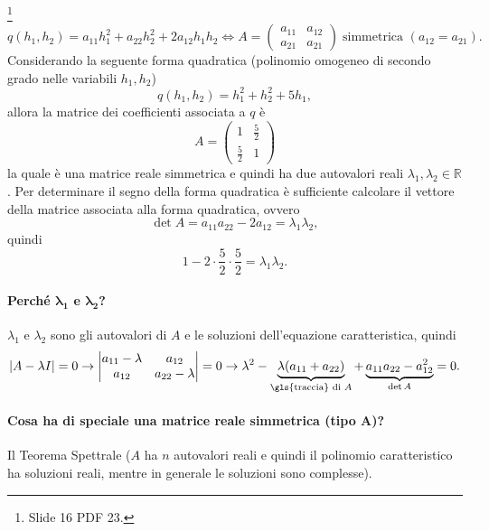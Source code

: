 \begin{example}[Forma quadratica, caso $n=2$]\footnote{Slide 16 PDF 23.}
	\begin{equation*}
		q(h_1, h_2) = a_{11} h_1^2 + a_{22} h_2^2 + 2 a_{12} h_1 h_2 \iff
		A =
		\begin{pmatrix}
			a_{11} & a_{12}\\
			a_{21} & a_{21}
		\end{pmatrix}\; \text{simmetrica } (a_{12}=a_{21}).
	\end{equation*}
	Considerando la seguente forma quadratica (polinomio omogeneo di secondo grado nelle variabili $h_1,h_2$)
	\begin{equation*}
		q(h_1,h_2) = h_1^2 + h_2^2 + 5 h_1,
	\end{equation*}
	allora la matrice dei coefficienti associata a $q$ è
	\begin{equation*}
		A =
		\begin{pmatrix}
			1 & \frac{5}{2}\\
			\frac{5}{2} & 1
		\end{pmatrix}
	\end{equation*}
	la quale è una matrice reale simmetrica e quindi ha due autovalori reali $\lambda_1,\lambda_2\in\mathbb{R}$. Per determinare il segno della forma quadratica è sufficiente calcolare il vettore della matrice associata alla forma quadratica, ovvero
	\begin{equation*}
		\det A = a_{11}a_{22} - 2a_{12} = \lambda_1\lambda_2,
	\end{equation*}
	quindi
	\begin{equation*}
		1-2\cdot\frac{5}{2}\cdot\frac{5}{2}=\lambda_1\lambda_2.
	\end{equation*}
	\paragraph{Perché $\boldsymbol{\lambda_1}$ e $\boldsymbol{\lambda_2}$?} $\lambda_1$ e $\lambda_2$ sono gli autovalori di $A$ e le soluzioni dell'equazione caratteristica, quindi
	\begin{equation*}
		|A-\lambda I| =0 \rightarrow
		\begin{vmatrix}
			a_{11} - \lambda & a_{12}\\
			a_{12} & a_{22} - \lambda
		\end{vmatrix} = 0 \rightarrow \lambda^2 - \underbrace{\lambda (a_{11} + a_{22})}_{\text{\gls{traccia} di } A} + \underbrace{a_{11} a_{22} - a_{12}^2}_{\det A} = 0.
	\end{equation*}
	\paragraph{Cosa ha di speciale una matrice reale simmetrica (tipo $\boldsymbol{A}$)?} Il Teorema Spettrale ($A$ ha $n$ autovalori reali e quindi il polinomio caratteristico ha soluzioni reali, mentre in generale le soluzioni sono complesse).
 \end{example}
 
